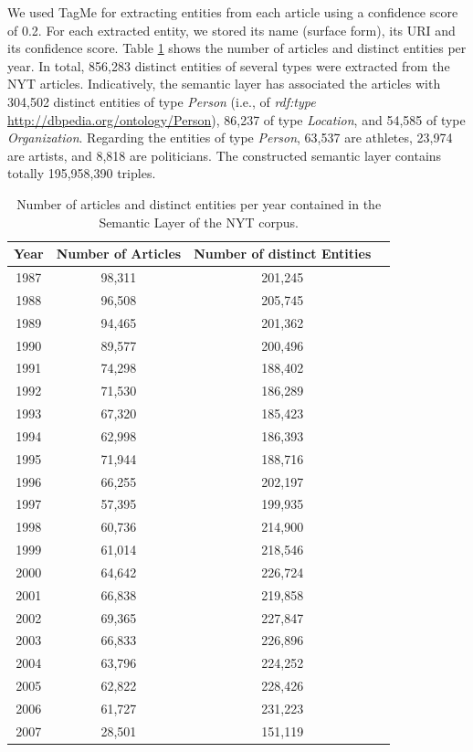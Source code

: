 \documentclass[twocolumn]{svjour3}
\begin{document}
We used TagMe \cite{ferragina2010tagme} for extracting
entities from each article using a
confidence score of 0.2.
For each extracted entity, we stored its name (surface form),
its URI and its confidence score.
Table \ref{tbl:nyt-tagme} shows the number of articles and distinct entities per year.
In total, 856,283 distinct entities
of several types were extracted from the NYT articles.
Indicatively, the semantic layer has associated the articles with
304,502 distinct entities of type {\em Person} (i.e., of {\em rdf:type} \url{http://dbpedia.org/ontology/Person}),
86,237 of type {\em Location},
and 54,585 of type {\em Organization}.
Regarding the entities of type {\em Person},
63,537 are athletes, 23,974 are artists, and 8,818 are politicians.
The constructed semantic layer contains totally
195,958,390 triples.

\begin{table}[]
\centering
\caption{Number of articles and distinct entities per year contained in the Semantic Layer of the NYT corpus.}
\label{tbl:nyt-tagme}
\vspace{-2mm}
\setlength{\tabcolsep}{3pt}
\begin{tabular}{|c|c|c|c|}
\hline
\rowcolor[HTML]{EFEFEF}
{\color[HTML]{000000} Year} & {\color[HTML]{000000} Number of Articles} & {\color[HTML]{000000} Number of distinct Entities} \\ \hline
1987 & 98,311 & 201,245\\ \hline
1988 & 96,508 & 205,745\\ \hline
1989 & 94,465 & 201,362\\ \hline
1990 & 89,577 & 200,496\\ \hline
1991 & 74,298 & 188,402\\ \hline
1992 & 71,530 & 186,289\\ \hline
1993 & 67,320 & 185,423\\ \hline
1994 & 62,998 & 186,393\\ \hline
1995 & 71,944 & 188,716\\ \hline
1996 & 66,255 & 202,197\\ \hline
1997 & 57,395 & 199,935\\ \hline
1998 & 60,736 & 214,900\\ \hline
1999 & 61,014 & 218,546\\ \hline
2000 & 64,642 & 226,724\\ \hline
2001 & 66,838 & 219,858\\ \hline
2002 & 69,365 & 227,847\\ \hline
2003 & 66,833 & 226,896\\ \hline
2004 & 63,796 & 224,252\\ \hline
2005 & 62,822 & 228,426\\ \hline
2006 & 61,727 & 231,223\\ \hline
2007 & 28,501 & 151,119\\ \hline
\end{tabular}
\end{table}
\end{document}
